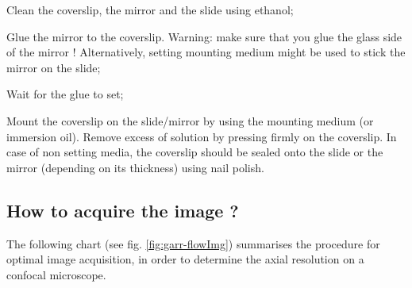 \documentclass[a4paper, 11pt]{report}%
\begin{document}
\begin{enumerate*}
	\item Clean the coverslip, the mirror and the slide using ethanol;
	\item Glue the mirror to the coverslip. Warning: make sure that you glue the glass side of the mirror ! Alternatively, setting mounting medium might be used to stick the mirror on the slide;
	\item Wait for the glue to set;
	\item Mount the coverslip on the slide/mirror by using the mounting medium (or immersion oil). Remove excess of solution by pressing firmly on the coverslip. In case of non setting media, the coverslip should be sealed onto the slide or the mirror (depending on its thickness) using nail polish.
\end{enumerate*}


\subsection{How to acquire the image ?}
\label{sec:garr-flow}

The following chart (see fig. \ref{fig:garr-flowImg}) summarises the procedure for optimal image acquisition, in order to determine the axial resolution on a confocal microscope.
\end{document}
